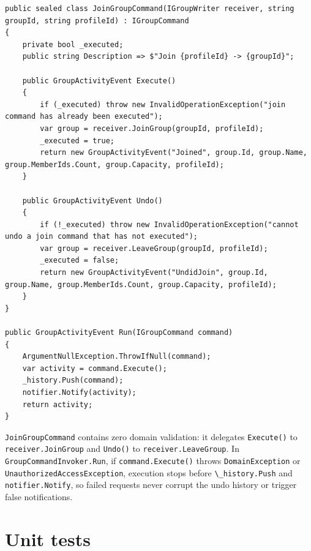 \documentclass{utmreport}
\providecommand{\passthrough}[1]{#1}
\begin{document}
\begin{lstlisting}
public sealed class JoinGroupCommand(IGroupWriter receiver, string groupId, string profileId) : IGroupCommand
{
    private bool _executed;
    public string Description => $"Join {profileId} -> {groupId}";

    public GroupActivityEvent Execute()
    {
        if (_executed) throw new InvalidOperationException("join command has already been executed");
        var group = receiver.JoinGroup(groupId, profileId);
        _executed = true;
        return new GroupActivityEvent("Joined", group.Id, group.Name, group.MemberIds.Count, group.Capacity, profileId);
    }

    public GroupActivityEvent Undo()
    {
        if (!_executed) throw new InvalidOperationException("cannot undo a join command that has not executed");
        var group = receiver.LeaveGroup(groupId, profileId);
        _executed = false;
        return new GroupActivityEvent("UndidJoin", group.Id, group.Name, group.MemberIds.Count, group.Capacity, profileId);
    }
}

public GroupActivityEvent Run(IGroupCommand command)
{
    ArgumentNullException.ThrowIfNull(command);
    var activity = command.Execute();
    _history.Push(command);
    notifier.Notify(activity);
    return activity;
}
\end{lstlisting}

\passthrough{\lstinline!JoinGroupCommand!} contains zero domain validation: it delegates \passthrough{\lstinline!Execute()!} to \passthrough{\lstinline!receiver.JoinGroup!} and \passthrough{\lstinline!Undo()!} to \passthrough{\lstinline!receiver.LeaveGroup!}. In \passthrough{\lstinline!GroupCommandInvoker.Run!}, if \passthrough{\lstinline!command.Execute()!} throws \passthrough{\lstinline!DomainException!} or \passthrough{\lstinline!UnauthorizedAccessException!}, execution stops before \passthrough{\lstinline!\_history.Push!} and \passthrough{\lstinline!notifier.Notify!}, so failed requests never corrupt the undo history or trigger false notifications.

\section{Unit tests}
\end{document}
